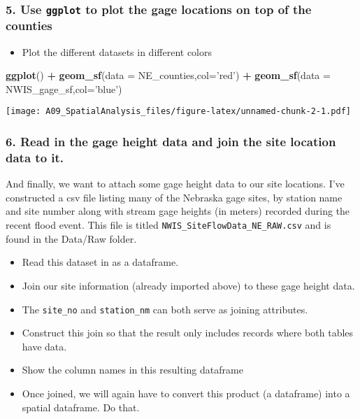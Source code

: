 \documentclass[]{article}
\newenvironment{Shaded}{\begin{snugshade}}{\end{snugshade}}
\newcommand{\KeywordTok}[1]{\textcolor[rgb]{0.13,0.29,0.53}{\textbf{#1}}}
\newcommand{\DataTypeTok}[1]{\textcolor[rgb]{0.13,0.29,0.53}{#1}}
\newcommand{\StringTok}[1]{\textcolor[rgb]{0.31,0.60,0.02}{#1}}
\newcommand{\OperatorTok}[1]{\textcolor[rgb]{0.81,0.36,0.00}{\textbf{#1}}}
\newcommand{\NormalTok}[1]{#1}
\providecommand{\tightlist}{%
  \setlength{\itemsep}{0pt}\setlength{\parskip}{0pt}}
\begin{document}
\subsubsection{\texorpdfstring{5. Use \texttt{ggplot} to plot the gage
locations on top of the
counties}{5. Use ggplot to plot the gage locations on top of the counties}}\label{use-ggplot-to-plot-the-gage-locations-on-top-of-the-counties}

\begin{itemize}
\tightlist
\item
  Plot the different datasets in different colors
\end{itemize}

\begin{Shaded}
\begin{Highlighting}[]
\KeywordTok{ggplot}\NormalTok{() }\OperatorTok{+}\StringTok{ }
\StringTok{  }\KeywordTok{geom_sf}\NormalTok{(}\DataTypeTok{data =}\NormalTok{ NE_counties,}\DataTypeTok{col=}\StringTok{'red'}\NormalTok{) }\OperatorTok{+}
\StringTok{  }\KeywordTok{geom_sf}\NormalTok{(}\DataTypeTok{data =}\NormalTok{ NWIS_gage_sf,}\DataTypeTok{col=}\StringTok{'blue'}\NormalTok{)}
\end{Highlighting}
\end{Shaded}

\texttt{[image: A09\_SpatialAnalysis\_files/figure-latex/unnamed-chunk-2-1.pdf]}

\subsubsection{6. Read in the gage height data and join the site
location data to
it.}\label{read-in-the-gage-height-data-and-join-the-site-location-data-to-it.}

And finally, we want to attach some gage height data to our site
locations. I've constructed a csv file listing many of the Nebraska gage
sites, by station name and site number along with stream gage heights
(in meters) recorded during the recent flood event. This file is titled
\texttt{NWIS\_SiteFlowData\_NE\_RAW.csv} and is found in the Data/Raw
folder.

\begin{itemize}
\tightlist
\item
  Read this dataset in as a dataframe.
\item
  Join our site information (already imported above) to these gage
  height data.
\item
  The \texttt{site\_no} and \texttt{station\_nm} can both serve as
  joining attributes.
\item
  Construct this join so that the result only includes records where
  both tables have data.
\item
  Show the column names in this resulting dataframe
\item
  Once joined, we will again have to convert this product (a dataframe)
  into a spatial dataframe. Do that.
\end{itemize}
\end{document}
